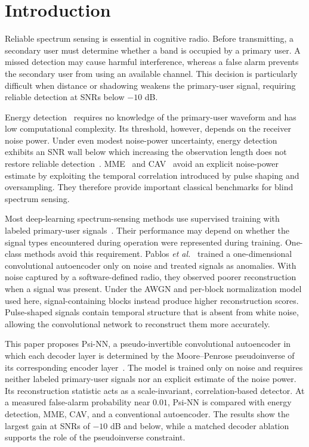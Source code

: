 \documentclass[conference]{IEEEtran}
\begin{document}
\section{Introduction}

Reliable spectrum sensing is essential in cognitive radio. Before
transmitting, a secondary user must determine whether a band is
occupied by a primary user. A missed detection may cause harmful
interference, whereas a false alarm prevents the secondary user from
using an available channel. This decision is particularly difficult
when distance or shadowing weakens the primary-user signal, requiring
reliable detection at SNRs below $-10$ dB.

Energy detection~\cite{b1,b7} requires no knowledge of the
primary-user waveform and has low computational complexity. Its
threshold, however, depends on the receiver noise power. Under even
modest noise-power uncertainty, energy detection exhibits an SNR wall
below which increasing the observation length does not restore
reliable detection~\cite{b7}. MME~\cite{b3} and CAV~\cite{b4} avoid
an explicit noise-power estimate by exploiting the temporal correlation
introduced by pulse shaping and oversampling. They therefore provide
important classical benchmarks for blind spectrum sensing.

Most deep-learning spectrum-sensing methods use supervised training
with labeled primary-user signals~\cite{b5}. Their performance may
depend on whether the signal types encountered during operation were
represented during training. One-class methods avoid this requirement.
Pablos \emph{et al.}~\cite{b2} trained a one-dimensional convolutional
autoencoder only on noise and treated signals as anomalies. With noise
captured by a software-defined radio, they observed poorer
reconstruction when a signal was present. Under the AWGN and per-block
normalization model used here, signal-containing blocks instead produce
higher reconstruction scores. Pulse-shaped signals contain temporal
structure that is absent from white noise, allowing the convolutional
network to reconstruct them more accurately.

This paper proposes Psi-NN, a pseudo-invertible convolutional
autoencoder in which each decoder layer is determined by the
Moore--Penrose pseudoinverse of its corresponding encoder
layer~\cite{b8}. The model is trained only on noise and requires neither
labeled primary-user signals nor an explicit estimate of the noise
power. Its reconstruction statistic acts as a scale-invariant,
correlation-based detector. At a measured false-alarm probability near
$0.01$, Psi-NN is compared with energy detection, MME, CAV, and a
conventional autoencoder. The results show the largest gain at SNRs of
$-10$ dB and below, while a matched decoder ablation supports the role
of the pseudoinverse constraint.
\end{document}
